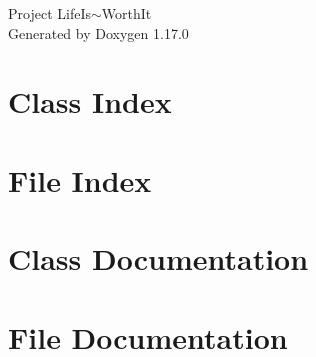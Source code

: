 \documentclass[twoside]{book}
\newcommand{\+}{\discretionary{\mbox{\scriptsize$\hookleftarrow$}}{}{}}
\newcommand{\clearemptydoublepage}{%
    \newpage{\pagestyle{empty}\cleardoublepage}%
  }
\begin{document}
  \raggedbottom
    \hypersetup{pageanchor=false,
                bookmarksnumbered=true,
                pdfencoding=unicode
               }
  \begin{titlepage}
  \vspace*{7cm}
  \begin{center}%
  {\Large Project Life\+Is\texorpdfstring{$\sim$}{\string~}\+Worth\+It}\\
  \vspace*{1cm}
  {\large Generated by Doxygen 1.17.0}\\
  \end{center}
  \end{titlepage}
  \clearemptydoublepage
  \tableofcontents
  \clearemptydoublepage
  \hypersetup{pageanchor=true}


\chapter{Class Index}

\chapter{File Index}

\chapter{Class Documentation}

\chapter{File Documentation}


  \backmatter
  \newpage
  \clearemptydoublepage
  \printindex
\end{document}
